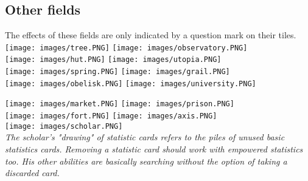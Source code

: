 \documentclass[12pt]{article}
\begin{document}
\subsection*{Other fields}
The effects of these fields are only indicated by a question mark on their tiles.\\[6pt]
\texttt{[image: images/tree.PNG]}
\texttt{[image: images/observatory.PNG]}\\
\texttt{[image: images/hut.PNG]}
\texttt{[image: images/utopia.PNG]}\\
\texttt{[image: images/spring.PNG]}
\texttt{[image: images/grail.PNG]}\\
\texttt{[image: images/obelisk.PNG]}
\texttt{[image: images/university.PNG]}

\clearpage
\texttt{[image: images/market.PNG]}
\texttt{[image: images/prison.PNG]}\\
\texttt{[image: images/fort.PNG]}
\texttt{[image: images/axis.PNG]}\\
\texttt{[image: images/scholar.PNG]}\\
\textit{The scholar's "drawing" of statistic cards refers to the piles of unused basic statistics cards. Removing a statistic card should work with empowered statistics too. His other abilities are basically searching without the option of taking a discarded card.}
\clearpage
\end{document}
